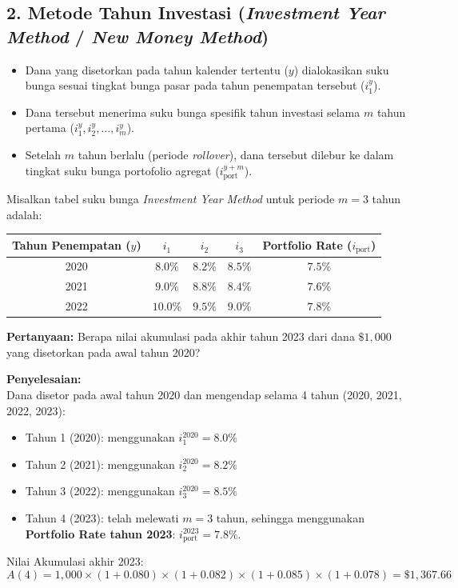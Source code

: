 \documentclass[11pt,a4paper]{article}
\begin{document}
\subsection{2. Metode Tahun Investasi (\textit{Investment Year Method} / \textit{New Money Method})}
\begin{itemize}[leftmargin=1.5em]
    \item Dana yang disetorkan pada tahun kalender tertentu ($y$) dialokasikan suku bunga sesuai tingkat bunga pasar pada tahun penempatan tersebut ($i_1^y$).
    \item Dana tersebut menerima suku bunga spesifik tahun investasi selama $m$ tahun pertama ($i_1^y, i_2^y, \dots, i_m^y$).
    \item Setelah $m$ tahun berlalu (periode \textit{rollover}), dana tersebut dilebur ke dalam tingkat suku bunga portofolio agregat ($i_{\text{port}}^{y+m}$).
\end{itemize}

\begin{examplebox}
Misalkan tabel suku bunga \textit{Investment Year Method} untuk periode $m = 3$ tahun adalah:
\begin{center}
\small
\renewcommand{\arraystretch}{1.2}
\begin{tabular}{ccccc}
\toprule
\textbf{Tahun Penempatan ($y$)} & \textbf{$i_1$} & \textbf{$i_2$} & \textbf{$i_3$} & \textbf{Portfolio Rate ($i_{\text{port}}$)} \\
\midrule
2020 & $8.0\%$ & $8.2\%$ & $8.5\%$ & $7.5\%$ \\
2021 & $9.0\%$ & $8.8\%$ & $8.4\%$ & $7.6\%$ \\
2022 & $10.0\%$ & $9.5\%$ & $9.0\%$ & $7.8\%$ \\
\bottomrule
\end{tabular}
\end{center}
\textbf{Pertanyaan:} Berapa nilai akumulasi pada akhir tahun 2023 dari dana $\$1{,}000$ yang disetorkan pada awal tahun 2020?

\vspace{0.5em}
\textbf{Penyelesaian:}\\
Dana disetor pada awal tahun 2020 dan mengendap selama 4 tahun (2020, 2021, 2022, 2023):
\begin{itemize}
    \item Tahun 1 (2020): menggunakan $i_1^{2020} = 8.0\%$
    \item Tahun 2 (2021): menggunakan $i_2^{2020} = 8.2\%$
    \item Tahun 3 (2022): menggunakan $i_3^{2020} = 8.5\%$
    \item Tahun 4 (2023): telah melewati $m = 3$ tahun, sehingga menggunakan \textbf{Portfolio Rate tahun 2023}: $i_{\text{port}}^{2023} = 7.8\%$.
\end{itemize}
Nilai Akumulasi akhir 2023:
\begin{equation*}
    A(4) = 1{,}000 \times (1 + 0.080) \times (1 + 0.082) \times (1 + 0.085) \times (1 + 0.078) = \$1{,}367.66
\end{equation*}
\end{examplebox}
\end{document}
